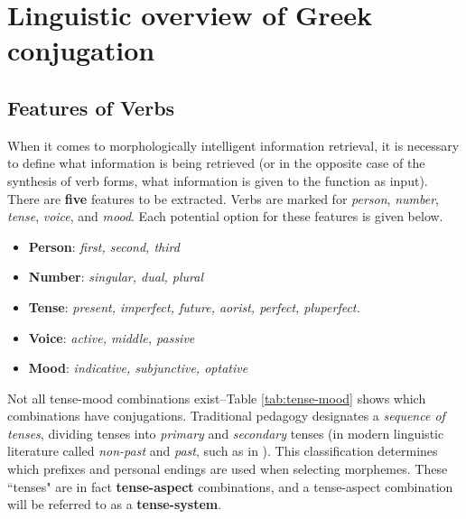 \documentclass[12pt]{article}
\begin{document}
\section{Linguistic overview of Greek conjugation}

\subsection{Features of Verbs}

When it comes to morphologically intelligent information retrieval, it is
necessary to define what information is being retrieved (or in the opposite
case of the synthesis of verb forms, what information is given to the function
as input). There are \textbf{five} features to be extracted. Verbs are marked
for \textit{person}, \textit{number}, \textit{tense}, \textit{voice}, and
\textit{mood}. Each potential option for these features is given below.

\begin{itemize}
    \item \textbf{Person}: \textit{first, second, third}
    \item \textbf{Number}: \textit{singular, dual, plural}
    \item \textbf{Tense}: \textit{present, imperfect, future, aorist, perfect, pluperfect.}
    \item \textbf{Voice}: \textit{active, middle, passive}
    \item \textbf{Mood}: \textit{indicative, subjunctive, optative}
\end{itemize}

Not all tense-mood combinations exist--Table \ref{tab:tense-mood} shows which
combinations have conjugations. Traditional pedagogy designates a
\textit{sequence of tenses}, dividing tenses into \textit{primary} and
\textit{secondary} tenses (in modern linguistic literature called
\textit{non-past} and \textit{past}, such as in \citet{willi2018}). This
classification determines which prefixes and personal endings are used when
selecting morphemes. These ``tenses" are in fact \textbf{tense-aspect}
combinations, and a tense-aspect combination will be referred to as a
\textbf{tense-system}.
\end{document}
